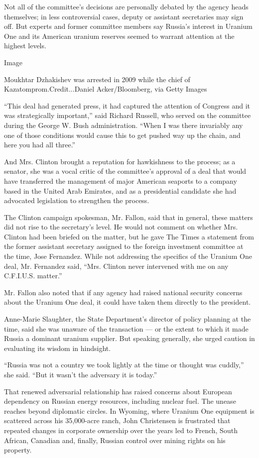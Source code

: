 Not all of the committee's decisions are personally debated by the
agency heads themselves; in less controversial cases, deputy or
assistant secretaries may sign off. But experts and former committee
members say Russia's interest in Uranium One and its American uranium
reserves seemed to warrant attention at the highest levels.

Image

Moukhtar Dzhakishev was arrested in 2009 while the chief of
Kazatomprom.Credit...Daniel Acker/Bloomberg, via Getty Images

``This deal had generated press, it had captured the attention of
Congress and it was strategically important,'' said Richard Russell, who
served on the committee during the George W. Bush administration. ``When
I was there invariably any one of those conditions would cause this to
get pushed way up the chain, and here you had all three.''

And Mrs. Clinton brought a reputation for hawkishness to the process; as
a senator, she was a vocal critic of the committee's approval of a deal
that would have transferred the management of major American seaports to
a company based in the United Arab Emirates, and as a presidential
candidate she had advocated legislation to strengthen the process.

The Clinton campaign spokesman, Mr. Fallon, said that in general, these
matters did not rise to the secretary's level. He would not comment on
whether Mrs. Clinton had been briefed on the matter, but he gave The
Times a statement from the former assistant secretary assigned to the
foreign investment committee at the time, Jose Fernandez. While not
addressing the specifics of the Uranium One deal, Mr. Fernandez said,
``Mrs. Clinton never intervened with me on any C.F.I.U.S. matter.''

Mr. Fallon also noted that if any agency had raised national security
concerns about the Uranium One deal, it could have taken them directly
to the president.

Anne-Marie Slaughter, the State Department's director of policy planning
at the time, said she was unaware of the transaction --- or the extent
to which it made Russia a dominant uranium supplier. But speaking
generally, she urged caution in evaluating its wisdom in hindsight.

``Russia was not a country we took lightly at the time or thought was
cuddly,'' she said. ``But it wasn't the adversary it is today.''

That renewed adversarial relationship has raised concerns about European
dependency on Russian energy resources, including nuclear fuel. The
unease reaches beyond diplomatic circles. In Wyoming, where Uranium One
equipment is scattered across his 35,000-acre ranch, John Christensen is
frustrated that repeated changes in corporate ownership over the years
led to French, South African, Canadian and, finally, Russian control
over mining rights on his property.

